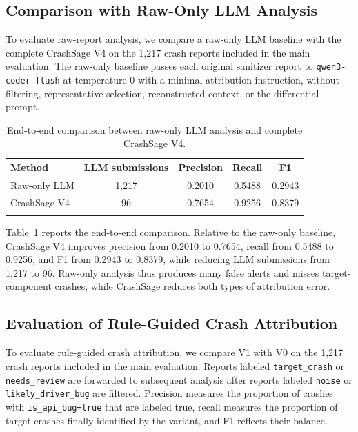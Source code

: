 \documentclass[pdflatex,sn-basic]{sn-jnl}%
\renewcommand{\arraystretch}{1.16}%
\theoremstyle{thmstyleone}%
\theoremstyle{thmstyletwo}%
\theoremstyle{thmstylethree}%
\begin{document}
\FloatBarrier
\subsection{{\color{blue}Comparison with Raw-Only LLM Analysis}}
\label{subsec:baseline-comparison}

{\color{blue}
To evaluate raw-report analysis, we compare a raw-only LLM baseline with the complete CrashSage V4 on the 1,217 crash reports included in the main evaluation. The raw-only baseline passes each original sanitizer report to \texttt{qwen3-coder-flash} at temperature 0 with a minimal attribution instruction, without filtering, representative selection, reconstructed context, or the differential prompt.
}

\begin{table}[!htbp]
\caption{{\color{blue}End-to-end comparison between raw-only LLM analysis and complete CrashSage V4.}}
\label{tab:baseline-comparison}
\centering
\color{blue}
\small
\setlength{\tabcolsep}{3pt}
\renewcommand{\arraystretch}{1.12}
\begin{tabular*}{\linewidth}{@{\extracolsep{\fill}}lcccc}
\toprule
Method & LLM submissions & Precision & Recall & F1 \\
\midrule
Raw-only LLM & 1,217 & 0.2010 & 0.5488 & 0.2943 \\
CrashSage V4 & 96 & 0.7654 & 0.9256 & 0.8379 \\
\botrule
\end{tabular*}
\end{table}

{\color{blue}
Table~\ref{tab:baseline-comparison} reports the end-to-end comparison. Relative to the raw-only baseline, CrashSage V4 improves precision from 0.2010 to 0.7654, recall from 0.5488 to 0.9256, and F1 from 0.2943 to 0.8379, while reducing LLM submissions from 1,217 to 96. Raw-only analysis thus produces many false alerts and misses target-component crashes, while CrashSage reduces both types of attribution error.
}

\subsection{Evaluation of Rule-Guided Crash Attribution}
\label{subsec:rule-attribution}

To evaluate rule-guided crash attribution, we compare V1 with V0 on the 1,217 crash reports included in the main evaluation. Reports labeled \texttt{target\_crash} or \texttt{needs\_review} are forwarded to subsequent analysis after reports labeled \texttt{noise} or \texttt{likely\_driver\_bug} are filtered. Precision measures the proportion of crashes with \texttt{is\_api\_bug=true} that are labeled true, recall measures the proportion of target crashes finally identified by the variant, and F1 reflects their balance.
\end{document}
